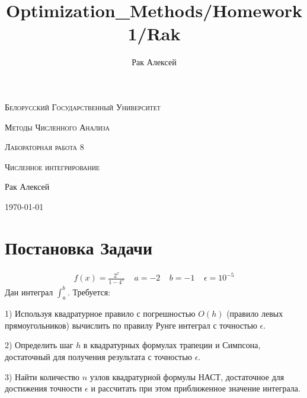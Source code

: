 \documentclass[10pt]{scrartcl}
\begin{document}
\author{Рак Алексей}
\title{Optimization_Methods/Homework1/Rak}
\begin{titlepage}
		\centering
		{\scshape\LARGE Белорусский Государственный Университет \par}
        \vfill
        {\scshape\LARGE Методы Численного Анализа\par}
        \vspace{1cm}
        {\scshape\LARGE Лабораторная работа 8\par}
        \vspace{1cm}
        {\scshape\LARGE Численное интегрирование\par}
        \vspace{2cm}
        {\LARGE Рак Алексей\par}
        \vfill
        {\large \today}
\end{titlepage}
\section*{Постановка Задачи}\noindent
\begin{gather*}
f(x) = \frac{2^x}{1 - 4^x} \ \ \ \ \ a = -2 \ \ \ \ \ b = -1 \ \ \ \ \ \epsilon = 10^{-5}
\end{gather*}
Дан интеграл $\int_a^b$. Требуется:

1) Используя квадратурное правило с погрешностью $O(h)$ (правило левых прямоугольников) вычислить по правилу
Рунге интеграл с точностью $\epsilon$.

2) Определить шаг $h$ в квадратурных формулах трапеции и Симпсона, достаточный для получения результата с
точностью $\epsilon$.

3) Найти количество $n$ узлов квадратурной формулы НАСТ, достаточное для достижения точности $\epsilon$ и
рассчитать при этом приближенное значение интеграла.
\end{document}
